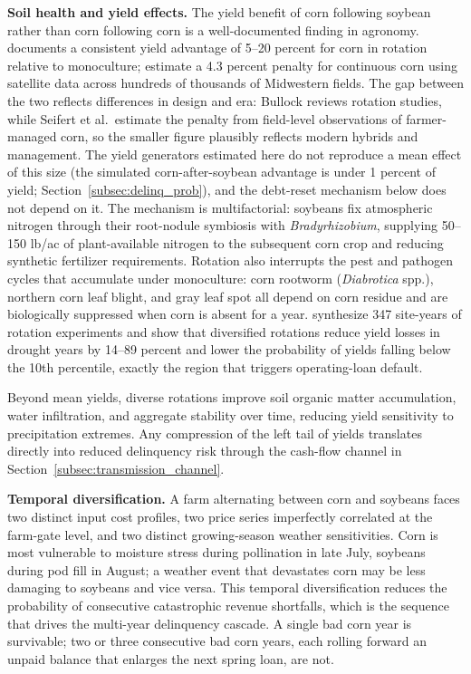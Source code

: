 \documentclass[11pt,letterpaper]{article}
\theoremstyle{remark}
\begin{document}
\textbf{Soil health and yield effects.} The yield benefit of corn following soybean rather than corn following corn is a well-documented finding in agronomy. \citet{Bullock1992} documents a consistent yield advantage of 5--20 percent for corn in rotation relative to monoculture; \citet{Seifert2017} estimate a 4.3 percent penalty for continuous corn using satellite data across hundreds of thousands of Midwestern fields. The gap between the two reflects differences in design and era: Bullock reviews rotation studies, while Seifert et al.\ estimate the penalty from field-level observations of farmer-managed corn, so the smaller figure plausibly reflects modern hybrids and management. The yield generators estimated here do not reproduce a mean effect of this size (the simulated corn-after-soybean advantage is under 1 percent of yield; Section~\ref{subsec:delinq_prob}), and the debt-reset mechanism below does not depend on it. The mechanism is multifactorial: soybeans fix atmospheric nitrogen through their root-nodule symbiosis with \textit{Bradyrhizobium}, supplying 50--150 lb/ac of plant-available nitrogen to the subsequent corn crop and reducing synthetic fertilizer requirements. Rotation also interrupts the pest and pathogen cycles that accumulate under monoculture: corn rootworm (\textit{Diabrotica} spp.), northern corn leaf blight, and gray leaf spot all depend on corn residue and are biologically suppressed when corn is absent for a year. \citet{Bowles2020} synthesize 347 site-years of rotation experiments and show that diversified rotations reduce yield losses in drought years by 14--89 percent and lower the probability of yields falling below the 10th percentile, exactly the region that triggers operating-loan default.
 
Beyond mean yields, diverse rotations improve soil organic matter accumulation, water infiltration, and aggregate stability over time, reducing yield sensitivity to precipitation extremes. Any compression of the left tail of yields translates directly into reduced delinquency risk through the cash-flow channel in Section~\ref{subsec:transmission_channel}.
 
\textbf{Temporal diversification.} A farm alternating between corn and soybeans faces two distinct input cost profiles, two price series imperfectly correlated at the farm-gate level, and two distinct growing-season weather sensitivities. Corn is most vulnerable to moisture stress during pollination in late July, soybeans during pod fill in August; a weather event that devastates corn may be less damaging to soybeans and vice versa. This temporal diversification reduces the probability of consecutive catastrophic revenue shortfalls, which is the sequence that drives the multi-year delinquency cascade. A single bad corn year is survivable; two or three consecutive bad corn years, each rolling forward an unpaid balance that enlarges the next spring loan, are not.
 
\end{document}
